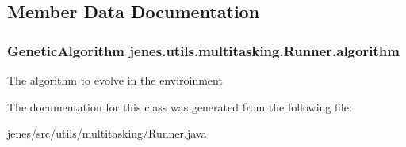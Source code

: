 \subsection{Member Data Documentation}
\hypertarget{classjenes_1_1utils_1_1multitasking_1_1_runner_a699ccf526b6116f97abc09e4ce390c89}{
\subsubsection[{algorithm}]{\setlength{\rightskip}{0pt plus 5cm}Genetic\-Algorithm jenes.\-utils.\-multitasking.\-Runner.\-algorithm\hspace{0.3cm}{\ttfamily [protected]}}}\label{classjenes_1_1utils_1_1multitasking_1_1_runner_a699ccf526b6116f97abc09e4ce390c89}
The algorithm to evolve in the enviroinment 

The documentation for this class was generated from the following file\-:\begin{DoxyCompactItemize}
\item 
jenes/src/utils/multitasking/Runner.\-java\end{DoxyCompactItemize}
